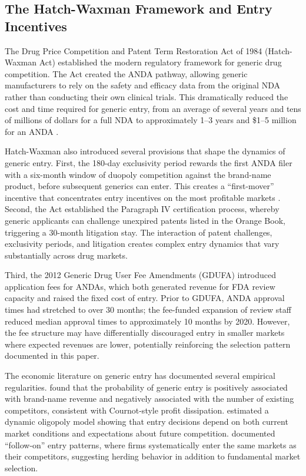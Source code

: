 \documentclass[12pt]{article}
\begin{document}
\subsection{The Hatch-Waxman Framework and Entry Incentives}

The Drug Price Competition and Patent Term Restoration Act of 1984 (Hatch-Waxman Act) established the modern regulatory framework for generic drug competition. The Act created the ANDA pathway, allowing generic manufacturers to rely on the safety and efficacy data from the original NDA rather than conducting their own clinical trials. This dramatically reduced the cost and time required for generic entry, from an average of several years and tens of millions of dollars for a full NDA to approximately 1--3 years and \$1--5 million for an ANDA \citep{Grabowski2014}.

Hatch-Waxman also introduced several provisions that shape the dynamics of generic entry. First, the 180-day exclusivity period rewards the first ANDA filer with a six-month window of duopoly competition against the brand-name product, before subsequent generics can enter. This creates a ``first-mover'' incentive that concentrates entry incentives on the most profitable markets \citep{Olson2014}. Second, the Act established the Paragraph IV certification process, whereby generic applicants can challenge unexpired patents listed in the Orange Book, triggering a 30-month litigation stay. The interaction of patent challenges, exclusivity periods, and litigation creates complex entry dynamics that vary substantially across drug markets.

Third, the 2012 Generic Drug User Fee Amendments (GDUFA) introduced application fees for ANDAs, which both generated revenue for FDA review capacity and raised the fixed cost of entry. Prior to GDUFA, ANDA approval times had stretched to over 30 months; the fee-funded expansion of review staff reduced median approval times to approximately 10 months by 2020. However, the fee structure may have differentially discouraged entry in smaller markets where expected revenues are lower, potentially reinforcing the selection pattern documented in this paper.

The economic literature on generic entry has documented several empirical regularities. \citet{Scott2005} found that the probability of generic entry is positively associated with brand-name revenue and negatively associated with the number of existing competitors, consistent with Cournot-style profit dissipation. \citet{Ching2010} estimated a dynamic oligopoly model showing that entry decisions depend on both current market conditions and expectations about future competition. \citet{Arcidiacono2013} documented ``follow-on'' entry patterns, where firms systematically enter the same markets as their competitors, suggesting herding behavior in addition to fundamental market selection.
\end{document}
